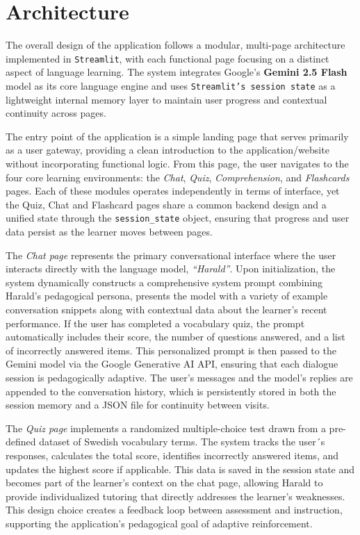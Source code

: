 \documentclass[a4paper,10pt]{article}
\begin{document}
\section{Architecture}
The overall design of the application follows a modular, multi-page architecture implemented in \texttt{Streamlit}, with each functional page focusing on a distinct aspect of language learning. The system integrates Google’s \textbf{Gemini 2.5 Flash} model as its core language engine and uses \texttt{Streamlit’s session state} as a lightweight internal memory layer to maintain user progress and contextual continuity across pages.

The entry point of the application is a simple landing page that serves primarily as a user gateway, providing a clean introduction to the application/website without incorporating functional logic. From this page, the user navigates to the four core learning environments: the \textit{Chat}, \textit{Quiz}, \textit{Comprehension}, and \textit{Flashcards} pages. Each of these modules operates independently in terms of interface, yet the Quiz, Chat and Flashcard pages share a common backend design and a unified state through the \texttt{session\_state} object, ensuring that progress and user data persist as the learner moves between pages.

The \textit{Chat page} represents the primary conversational interface where the user interacts directly with the language model, \textit{“Harald”}. Upon initialization, the system dynamically constructs a comprehensive system prompt combining Harald’s pedagogical persona, presents the model with a variety of example conversation snippets along with contextual data about the learner’s recent performance. If the user has completed a vocabulary quiz, the prompt automatically includes their score, the number of questions answered, and a list of incorrectly answered items. This personalized prompt is then passed to the Gemini model via the Google Generative AI API, ensuring that each dialogue session is pedagogically adaptive. The user’s messages and the model’s replies are appended to the conversation history, which is persistently stored in both the session memory and a JSON file for continuity between visits. 

The \textit{Quiz page} implements a randomized multiple-choice test drawn from a pre-defined dataset of Swedish vocabulary terms. The system tracks the user´s responses, calculates the total score, identifies incorrectly answered items, and updates the highest score if applicable. This data is saved in the session state and becomes part of the learner’s context on the chat page, allowing Harald to provide individualized tutoring that directly addresses the learner’s weaknesses. This design choice creates a feedback loop between assessment and instruction, supporting the application’s pedagogical goal of adaptive reinforcement.
\end{document}
